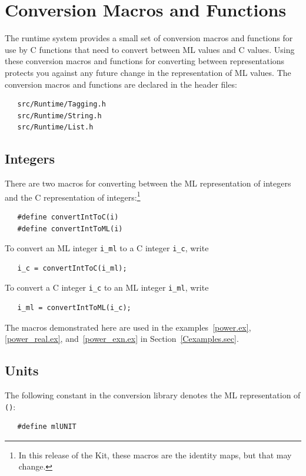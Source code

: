 \documentclass[12pt]{book}
\begin{document}
\section{Conversion Macros and Functions}
The runtime system provides a small set of conversion macros and
functions for use by C functions that need to convert between ML
values and C values. Using these conversion macros and functions for
converting between representations protects you against any future
change in the representation of ML values. The conversion macros and
functions are declared in the header
files:
\begin{verbatim}
   src/Runtime/Tagging.h
   src/Runtime/String.h
   src/Runtime/List.h
\end{verbatim}

\subsection{Integers}
There are two macros for converting between the ML representation of
integers and the C representation of integers:\footnote{In this
release of the Kit, these macros are the identity maps, but that may
change.}
%
%
\begin{verbatim}
   #define convertIntToC(i)
   #define convertIntToML(i)
\end{verbatim}
To convert an ML integer \verb|i_ml| to a C integer \verb|i_c|,
write 
\begin{verbatim}
   i_c = convertIntToC(i_ml);
\end{verbatim}
To convert a C integer \verb|i_c| to an ML
 integer \verb|i_ml|, write
\begin{verbatim}
   i_ml = convertIntToML(i_c);
\end{verbatim}
The macros demonstrated here are used in the examples~\ref{power.ex},
\ref{power_real.ex}, and~\ref{power_exn.ex} in Section~\ref{Cexamples.sec}.

\subsection{Units}
The following constant in the conversion library denotes the ML
representation of {\tt ()}:
%
\begin{verbatim}
   #define mlUNIT
\end{verbatim}
\end{document}
